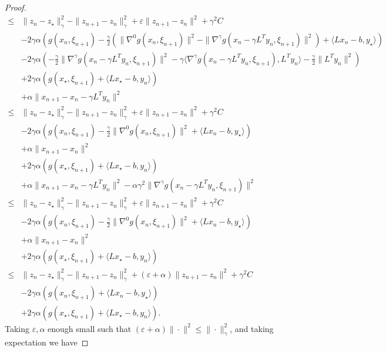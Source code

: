 \documentclass{article}
\newcommand{\1}{\mathbbm 1}
\newcommand{\ps}[1]{\langle #1 \rangle}
\theoremstyle{definition}
\begin{document}
\begin{proof}
\begin{align*}
\leq &\|z_{n} - z_\star\|_\gamma^2 - \|z_{n+1} - z_{n}\|_\gamma^2 + \varepsilon \|z_{n+1} - z_{n}\|^2 + \gamma^2 C \\
& -2\gamma\alpha \left( g(x_{n},\xi_{n+1}) - \frac{\gamma}{2}\left(\|\nabla^0 g(x_{n},\xi_{n+1})\|^2 - \|\nabla^\gamma g(x_n-\gamma L^T y_n,\xi_{n+1})\|^2\right) + \ps{L x_{n}-b,y_\star} \right)\\
&-2\gamma\alpha \left(-\frac{\gamma}{2}\|\nabla^\gamma g(x_n-\gamma L^T y_n,\xi_{n+1})\|^2 - \gamma\ps{\nabla^\gamma g(x_n-\gamma L^T y_n,\xi_{n+1}), L^T y_n} - \frac{\gamma}{2}\|L^T y_n\|^2 \right) \\
& +2\gamma \alpha\left( g(x_\star,\xi_{n+1}) + \ps{L x_\star-b,y_{n}} \right)\\
& +\alpha \|x_{n+1} - x_n - \gamma L^T y_n\|^2\\
\leq &\|z_{n} - z_\star\|_\gamma^2 - \|z_{n+1} - z_{n}\|_\gamma^2 + \varepsilon \|z_{n+1} - z_{n}\|^2 + \gamma^2 C \\
& -2\gamma\alpha \left( g(x_{n},\xi_{n+1}) - \frac{\gamma}{2}\|\nabla^0 g(x_{n},\xi_{n+1})\|^2 + \ps{L x_{n}-b,y_\star} \right)\\
& + \alpha\|x_{n+1} - x_n\|^2 \\
& +2\gamma \alpha\left( g(x_\star,\xi_{n+1}) + \ps{L x_\star-b,y_{n}} \right)\\
& + \alpha\|x_{n+1} - x_n - \gamma L^T y_n\|^2 - \alpha\gamma^2 \|\nabla^\gamma g(x_n-\gamma L^T y_n,\xi_{n+1})\|^2\\
\leq &\|z_{n} - z_\star\|_\gamma^2 - \|z_{n+1} - z_{n}\|_\gamma^2 + \varepsilon \|z_{n+1} - z_{n}\|^2 + \gamma^2 C \\
& -2\gamma\alpha \left( g(x_{n},\xi_{n+1}) - \frac{\gamma}{2}\|\nabla^0 g(x_{n},\xi_{n+1})\|^2 + \ps{L x_{n}-b,y_\star} \right)\\
& + \alpha\|x_{n+1} - x_n\|^2 \\
& +2\gamma\alpha \left( g(x_\star,\xi_{n+1}) + \ps{L x_\star-b,y_{n}} \right)\\
\leq &\|z_{n} - z_\star\|_\gamma^2 - \|z_{n+1} - z_{n}\|_\gamma^2 + (\varepsilon + \alpha) \|z_{n+1} - z_{n}\|^2 + \gamma^2 C \\
& -2\gamma\alpha \left( g(x_{n},\xi_{n+1}) + \ps{L x_{n}-b,y_\star} \right)\\
& +2\gamma\alpha \left( g(x_\star,\xi_{n+1}) + \ps{L x_\star-b,y_{n}} \right).
\end{align*}
Taking $\varepsilon, \alpha$ enough small such that $(\varepsilon + \alpha) \|\cdot\|^2 \leq \|\cdot\|_\gamma^2$, and taking expectation we have


\end{proof}
\end{document}
